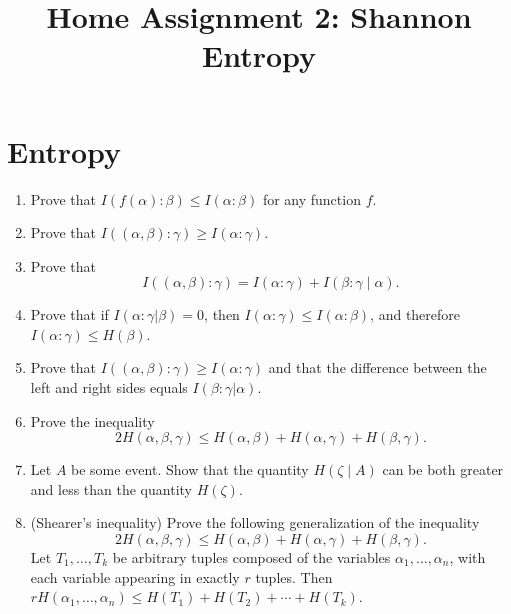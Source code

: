 \documentclass[a4paper]{article}
\title{Home Assignment 2: Shannon Entropy}
\date{\DTMdate{2019-02-21}}
\author{}
\begin{document}
\maketitle

\section*{Entropy}

\begin{enumerate}
  \item Prove that \(I(f(\alpha):\beta) \leq I(\alpha:\beta)\) for any function \(f\).

  \item Prove that \(I((\alpha,\beta):\gamma) \geq I(\alpha : \gamma)\).

  \item Prove that 
  \[
  I((\alpha,\beta):\gamma) = I(\alpha : \gamma) + I(\beta:\gamma \mid \alpha).
  \]

  \item Prove that if \(I(\alpha:\gamma|\beta) = 0\), then \(I(\alpha:\gamma) \leq I(\alpha:\beta)\), and therefore \(I(\alpha:\gamma) \leq H(\beta)\).

  \item Prove that \(I((\alpha,\beta):\gamma) \geq I(\alpha:\gamma)\) and that the difference between the left and right sides equals \(I(\beta:\gamma|\alpha)\).

  \item Prove the inequality 
  \[
  2H(\alpha,\beta,\gamma) \leq H(\alpha, \beta) + H(\alpha, \gamma) + H(\beta,\gamma).
  \]

  \item Let \(A\) be some event. Show that the quantity \(H(\zeta \mid A)\) can be both greater and less than the quantity \(H(\zeta)\).

  \item (Shearer's inequality) Prove the following generalization of the inequality
    \[
    2H(\alpha,\beta,\gamma) \leq H(\alpha, \beta) + H(\alpha, \gamma) + H(\beta,\gamma).
    \]
    Let \(T_1, \ldots , T_k\) be arbitrary tuples composed of the variables \(\alpha_1, \ldots, \alpha_n\), with each variable appearing in exactly \(r\) tuples. Then \(r H(\alpha_1,\dots, \alpha_n) \leq H(T_1) + H(T_2) + \cdots + H(T_k)\).

\end{enumerate}
\end{document}
